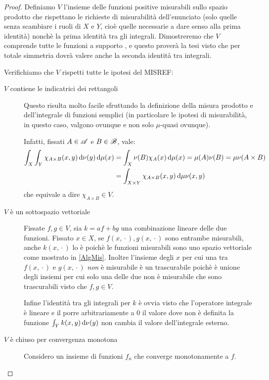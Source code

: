 \begin{proof}
	Definiamo $V$ l'insieme delle funzioni positive misurabili sullo spazio prodotto che rispettano le richieste di misurabilità dell'enunciato (solo quelle senza scambiare i ruoli di $X$ e $Y$, cioè quelle necessarie a dare senso alla prima identità) nonchè la prima identità tra gli integrali. Dimostreremo che $V$ comprende tutte le funzioni a supporto \sigfin[o], e questo proverà la tesi visto che per totale simmetria dovrà valere anche la seconda identità tra integrali. 
	
	Verifichiamo che $V$ rispetti tutte le ipotesi del MISREF:	
	\begin{description}
		\item[$V$ contiene le indicatrici dei rettangoli] Questo risulta molto facile sfruttando la definizione della misura prodotto e dell'integrale di funzioni semplici (in particolare le ipotesi di misurabilità, in questo caso, valgono ovunque e non solo $\mu$-quasi ovunque).
		
		Infatti, fissati $A\in\mathscr A$ e $B\in\mathscr B$, vale:
		\begin{align*}
			\int_X\int_Y \chi_{A\times B}(x,y) \,\mathrm d\nu(y)\,\mathrm d\mu(x) &=\int_X \nu(B)\chi_A(x)\,\mathrm d\mu(x)=\mu(A)\nu(B)=\mu\nu(A\times B)\\
			&=\int_{X\times Y}\chi_{A\times B}(x,y)\,\mathrm d\mu\nu(x,y)
		\end{align*}
		che equivale a dire $\chi_{A\times B}\in V$.
		\item[$V$ è un sottospazio vettoriale] Fissate $f,g\in V$, sia $k=af+bg$ una combinazione lineare delle due funzioni. 
		Fissato $x\in X$, se $f(x,{}\cdot{}),g(x,{}\cdot{})$ sono entrambe misurabili, anche $k(x,{}\cdot{})$ lo è poichè le funzioni misurabili sono uno spazio vettoriale come mostrato in \cref{AlgMis}. Inoltre l'insieme degli $x$ per cui una tra $f(x,{}\cdot{})$ e $g(x,{}\cdot{})$ \emph{non} è misurabile è un trascurabile poichè è unione degli insiemi per cui solo una delle due non è misurabile che sono trascurabili visto che $f,g\in V$.
		
		Infine l'identità tra gli integrali per $k$ è ovvia visto che l'operatore integrale è lineare e il porre arbitrariamente a $0$ il valore dove non è definita la funzione $\int_Yk(x,y)\,\mathrm d\nu(y)$ non cambia il valore dell'integrale esterno.
		\item[$V$ è chiuso per convergenza monotona] Considero un insieme di funzioni $f_n$ che converge monotonamente a $f$.
	\end{description}

\end{proof}

